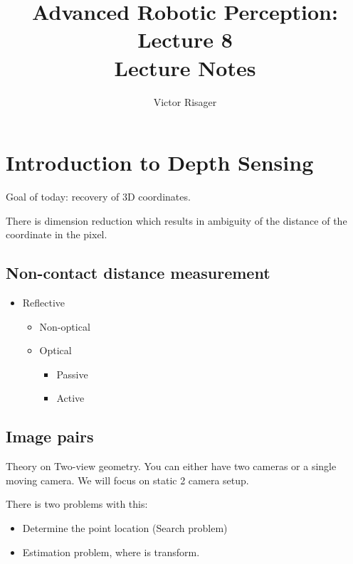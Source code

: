 \documentclass[a4paper]{article}
\title{Advanced Robotic Perception: Lecture 8 \\
	\large Lecture Notes}
\author{Victor Risager}
\begin{document}
\maketitle
\section{Introduction to Depth Sensing}
Goal of today: recovery of 3D coordinates.

There is dimension reduction which results in ambiguity of the distance of the coordinate in the pixel.


\subsection{Non-contact distance measurement}
\begin{itemize}
	\item Reflective 
		\begin{itemize}
			\item Non-optical
			\item Optical
				\begin{itemize}
					\item Passive
					\item Active 
				\end{itemize}
		\end{itemize}
\end{itemize}


\subsection{Image pairs}
Theory on Two-view geometry.
You can either have two cameras or a single moving camera. We will focus on static 2 camera setup. 

There is two problems with this:
\begin{itemize}
	\item Determine the point location (Search problem)
	\item Estimation problem, where is transform.
\end{itemize}
\end{document}
